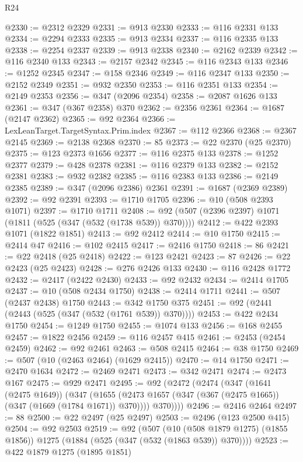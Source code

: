 \begin{lexlean}{R24}
\begin{coremodule}
@2330 := @2312 @2329
@2331 := @913 @2330
@2333 := @116 @2331 @133
@2334 := @2294 @2333
@2335 := @913 @2334
@2337 := @116 @2335 @133
@2338 := @2254 @2337
@2339 := @913 @2338
@2340 := @2162 @2339
@2342 := @116 @2340 @133
@2343 := @2157 @2342
@2345 := @116 @2343 @133
@2346 := @1252 @2345
@2347 := @158 @2346
@2349 := @116 @2347 @133
@2350 := @2152 @2349
@2351 := @932 @2350
@2353 := @116 @2351 @133
@2354 := @2149 @2353
@2356 := @347 (@2096 @2354)
@2358 := @2087 @1626 @133
@2361 := @347 (@367 @2358) @370
@2362 := @2356 @2361
@2364 := @1687 (@2147 @2362)
@2365 := @92 @2364
@2366 := LexLeanTarget.TargetSyntax.Prim.index
@2367 := @112 @2366
@2368 := @2367 @2145
@2369 := @2138 @2368
@2370 := 85
@2373 := @22 @2370 (@25 @2370)
@2375 := @123 @2373 @1656
@2377 := @116 @2375 @133
@2378 := @1252 @2377
@2379 := @428 @2378
@2381 := @116 @2379 @133
@2382 := @2152 @2381
@2383 := @932 @2382
@2385 := @116 @2383 @133
@2386 := @2149 @2385
@2389 := @347 (@2096 @2386) @2361
@2391 := @1687 (@2369 @2389)
@2392 := @92 @2391
@2393 := @1710 @1705
@2396 := @10 (@508 @2393 @1071)
@2397 := @1710 @1711
@2408 := @92 (@507 (@2396 @2397) @1071 (@1811 (@525 (@347 (@532 (@1738 @539)) @370))))
@2412 := @422 @2393 @1071 (@1822 @1851)
@2413 := @92 @2412
@2414 := @10 @1750
@2415 := @2414 @47
@2416 := @102 @2415
@2417 := @2416 @1750
@2418 := 86
@2421 := @22 @2418 (@25 @2418)
@2422 := @123 @2421
@2423 := 87
@2426 := @22 @2423 (@25 @2423)
@2428 := @276 @2426 @133
@2430 := @116 @2428 @1772
@2432 := @2417 (@2422 @2430)
@2433 := @92 @2432
@2434 := @2414 @1705
@2437 := @10 (@508 @2434 @1750)
@2438 := @2414 @1711
@2441 := @507 (@2437 @2438) @1750
@2443 := @342 @1750 @375
@2451 := @92 (@2441 (@2443 (@525 (@347 (@532 (@1761 @539)) @370))))
@2453 := @422 @2434 @1750
@2454 := @1249 @1750
@2455 := @1074 @133
@2456 := @168 @2455
@2457 := @1822 @2456
@2459 := @116 @2457 @415
@2461 := @2453 (@2454 @2459)
@2462 := @92 @2461
@2463 := @508 @2415
@2464 := @38 @1750
@2469 := @507 (@10 (@2463 @2464) (@1629 @2415))
@2470 := @14 @1750
@2471 := @2470 @1634
@2472 := @2469 @2471
@2473 := @342 @2471
@2474 := @2473 @167
@2475 := @929 @2471
@2495 := @92
    (@2472
      (@2474
        (@347
          (@1641 (@2475 @1649))
          (@347
            (@1655 (@2473 @1657 (@347 (@367 (@2475 @1665)) (@347 (@1669 (@1784 @1671)) @370))))
            @370))))
@2496 := @2416 @2464
@2497 := 88
@2500 := @22 @2497 (@25 @2497)
@2503 := @2496 (@123 @2500 @415)
@2504 := @92 @2503
@2519 := @92
    (@507
      (@10 (@508 @1879 @1275) (@1855 @1856))
      @1275
      (@1884 (@525 (@347 (@532 (@1863 @539)) @370))))
@2523 := @422 @1879 @1275 (@1895 @1851)

\end{coremodule}
\end{lexlean}
